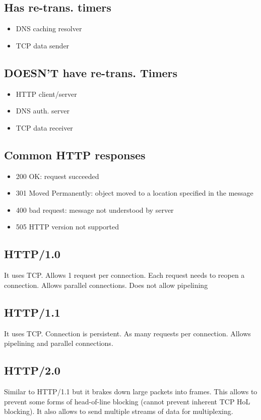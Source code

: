 \subsection*{Has re-trans. timers}
\begin{itemize}
  \item DNS caching resolver
  \item TCP data sender
\end{itemize}
\subsection*{DOESN'T have re-trans. Timers}
\begin{itemize}
  \item HTTP client/server
  \item DNS auth. server
  \item TCP data receiver
\end{itemize}
\subsection*{Common HTTP responses}
\begin{itemize}
  \item 200 OK: request succeeded
  \item 301 Moved Permanently: object moved to a location specified in the message
  \item 400 bad request: message not understood by server
  \item 505 HTTP version not supported
\end{itemize}
\subsection*{HTTP/1.0}
It uses TCP. Allows 1 request per connection. Each request needs to
reopen a connection. Allows parallel connections. Does not allow
pipelining
\subsection*{HTTP/1.1}
It uses TCP. Connection is persistent. As many requests per connection.
Allows pipelining and parallel connections.
\subsection*{HTTP/2.0}
Similar to HTTP/1.1 but it brakes down large packets into frames. This
allows to prevent some forms of head-of-line blocking (cannot prevent
inherent TCP HoL blocking). It also allows to send multiple streams of
data for multiplexing.
